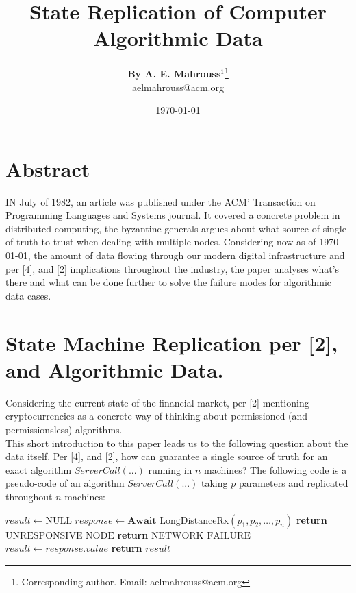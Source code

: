 \documentclass[10pt, twocolumn]{article}
\title{%
  \vspace{-1.5em}%
  \large\textbf{State Replication of Computer Algorithmic Data}%
}
\author{%
  \textbf{By A. E. Mahrouss}$^{1}$\thanks{Corresponding author. Email: aelmahrouss@acm.org}
  \\aelmahrouss@acm.org\\[0.4em]
}
\date{%
  \small \today
}
\theoremstyle{plain}
\theoremstyle{definition}
\theoremstyle{remark}
\begin{document}

\twocolumn[{%
  \maketitle
  \vspace{-0.5em}
  \vspace{0.8em}
  \rule{\linewidth}{0.4pt}
  \vspace{1em}
}]


\section{Abstract}

\lettrine[lines=2, lhang=0.1, loversize=0.2]{I}N July of 1982, an article was published under the ACM' Transaction on Programming Languages and Systems journal. It covered a concrete problem in distributed computing, the byzantine generals argues about what source of single of truth to trust when dealing with multiple nodes. Considering now as of \today, the amount of data flowing through our modern digital infrastructure and per [4], and [2] implications throughout the industry, the paper analyses what's there and what can be done further to solve the failure modes for algorithmic data cases.

\section{State Machine Replication per [2], and Algorithmic Data.}

Considering the current state of the financial market, per [2] mentioning cryptocurrencies as a concrete way of thinking about permissioned (and permissionsless) algorithms.\\
This short introduction to this paper leads us to the following question about the data itself. Per [4], and [2], how can guarantee a single source of truth for an exact algorithm $ServerCall(...)$ running in $n$ machines? The following code is a pseudo-code of an algorithm $ServerCall(...)$ taking $p$ parameters and replicated throughout $n$ machines:

\begin{algorithm}
\caption{ServerCall(...)}
\begin{algorithmic}[1]
    \State $result \leftarrow \text{NULL}$
    \State $response \leftarrow \textbf{Await } \text{LongDistanceRx}(p_1, p_2, \dots, p_n)$
        \State \textbf{return} $\text{UNRESPONSIVE\_NODE}$
        \State \textbf{return} $\text{NETWORK\_FAILURE}$
    \Else
        \State $result \leftarrow response.value$
        \State \textbf{return} $result$
    \EndIf
\EndProcedure
\end{algorithmic}
\end{algorithm}
\end{document}
